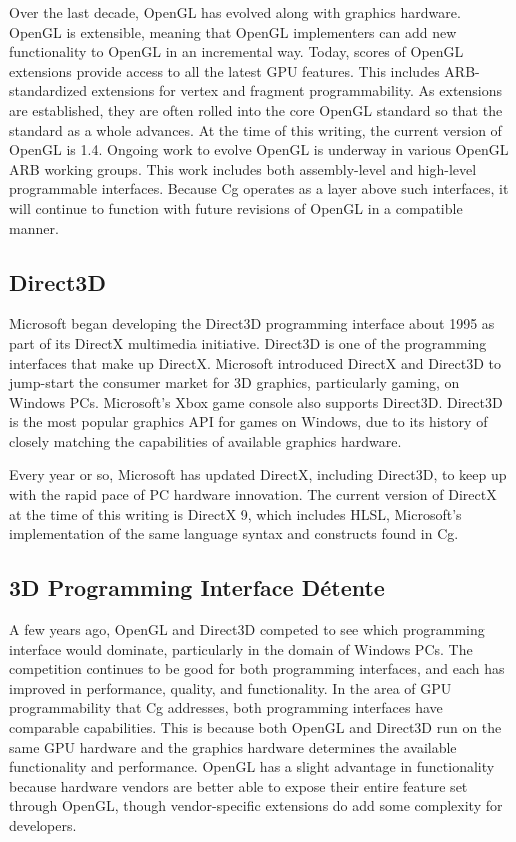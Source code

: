 \documentclass{book}
\begin{document}
Over the last decade, OpenGL has evolved along with graphics hardware. OpenGL is extensible, meaning that OpenGL implementers can add new functionality to OpenGL in an incremental way. Today, scores of OpenGL extensions provide access to all the latest GPU features. This includes ARB-standardized extensions for vertex and fragment programmability. As extensions are established, they are often rolled into the core OpenGL standard so that the standard as a whole advances. At the time of this writing, the current version of OpenGL is 1.4. Ongoing work to evolve OpenGL is underway in various OpenGL ARB working groups. This work includes both assembly-level and high-level programmable interfaces. Because Cg operates as a layer above such interfaces, it will continue to function with future revisions of OpenGL in a compatible manner.

\subsection*{Direct3D}

Microsoft began developing the Direct3D programming interface about 1995 as part of its DirectX multimedia initiative. Direct3D is one of the programming interfaces that make up DirectX. Microsoft introduced DirectX and Direct3D to jump-start the consumer market for 3D graphics, particularly gaming, on Windows PCs. Microsoft's Xbox game console also supports Direct3D. Direct3D is the most popular graphics API for games on Windows, due to its history of closely matching the capabilities of available graphics hardware.

Every year or so, Microsoft has updated DirectX, including Direct3D, to keep up with the rapid pace of PC hardware innovation. The current version of DirectX at the time of this writing is DirectX 9, which includes HLSL, Microsoft's implementation of the same language syntax and constructs found in Cg.

\subsection*{3D Programming Interface Détente}

A few years ago, OpenGL and Direct3D competed to see which programming interface would dominate, particularly in the domain of Windows PCs. The competition continues to be good for both programming interfaces, and each has improved in performance, quality, and functionality. In the area of GPU programmability that Cg addresses, both programming interfaces have comparable capabilities. This is because both OpenGL and Direct3D run on the same GPU hardware and the graphics hardware determines the available functionality and performance. OpenGL has a slight advantage in functionality because hardware vendors are better able to expose their entire feature set through OpenGL, though vendor-specific extensions do add some complexity for developers.
\end{document}
